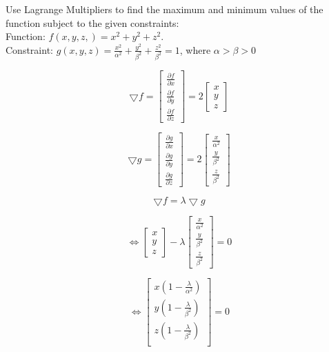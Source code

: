 \documentclass[12pt]{article}
\newcommand\tab[1][1cm]{\hspace*{#1}}
\begin{document}
\newpage

\section*{}


\tab Use Lagrange Multipliers to find the maximum and minimum values of the function subject to the given constraints: \\
\tab Function: $f(x,y,z,) = x^2 + y^2 + z^2$.  \\
\tab Constraint: $g(x,y,z) = \frac{x^2}{\alpha^2} + \frac{y^2}{\beta^2} + \frac{z^2}{\beta^2} = 1$, where $ \alpha > \beta > 0$ 


$$
\bigtriangledown f = 
\begin{bmatrix}
\frac{\partial f}{\partial x} \\
\frac{\partial f}{\partial y} \\
\frac{\partial f}{\partial z} 
\end{bmatrix} = 2
\begin{bmatrix}
x \\
y \\
z
\end{bmatrix}
 $$
 
$$
\bigtriangledown g = 
\begin{bmatrix}
\frac{\partial g}{\partial x} \\
\frac{\partial g}{\partial y} \\
\frac{\partial g}{\partial z} 
\end{bmatrix} = 2
\begin{bmatrix}
\frac{x}{\alpha^2} \\
\frac{y}{\beta^2} \\
\frac{z}{\beta^2}
\end{bmatrix}
 $$

$$
\bigtriangledown f  = \lambda\bigtriangledown g
$$

$$
\iff \begin{bmatrix}
x \\
y \\
z
\end{bmatrix}
- \lambda
\begin{bmatrix}
\frac{x}{\alpha^2} \\
\frac{y}{\beta^2} \\
\frac{z}{\beta^2}
\end{bmatrix}
= 0
 $$
 
$$ \iff
\begin{bmatrix}
x(1 - \frac{\lambda}{\alpha^2} ) \\
y(1 - \frac{\lambda}{\beta^2} ) \\
z(1 - \frac{\lambda}{\beta^2} ) \\
\end{bmatrix}
= 0
 $$ \\
\end{document}
